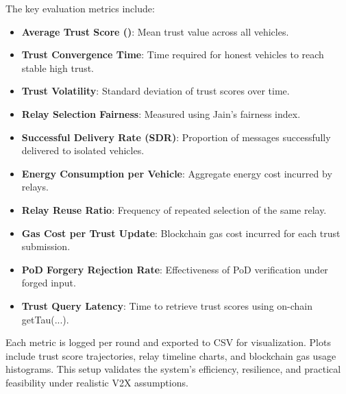 The key evaluation metrics include:
\begin{itemize}
\item \textbf{Average Trust Score ()}: Mean trust value across all vehicles.
\item \textbf{Trust Convergence Time}: Time required for honest vehicles to reach stable high trust.
\item \textbf{Trust Volatility}: Standard deviation of trust scores over time.
\item \textbf{Relay Selection Fairness}: Measured using Jain's fairness index.
\item \textbf{Successful Delivery Rate (SDR)}: Proportion of messages successfully delivered to isolated vehicles.
\item \textbf{Energy Consumption per Vehicle}: Aggregate energy cost incurred by relays.
\item \textbf{Relay Reuse Ratio}: Frequency of repeated selection of the same relay.
\item \textbf{Gas Cost per Trust Update}: Blockchain gas cost incurred for each trust submission.
\item \textbf{PoD Forgery Rejection Rate}: Effectiveness of PoD verification under forged input.
\item \textbf{Trust Query Latency}: Time to retrieve trust scores using on-chain getTau(...).
\end{itemize}

Each metric is logged per round and exported to CSV for visualization. Plots include trust score trajectories, relay timeline charts, and blockchain gas usage histograms. This setup validates the system's efficiency, resilience, and practical feasibility under realistic V2X assumptions.